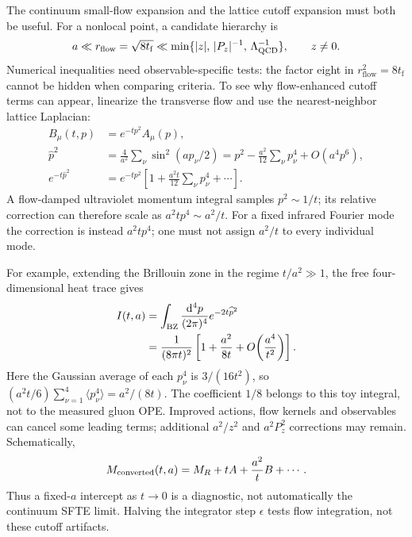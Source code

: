 \documentclass[11pt]{article}
\numberwithin{equation}{section}
\newcommand{\dd}{\mathrm{d}}
\newcommand{\rflow}{r_{\mathrm{flow}}}
\newcommand{\tf}{t_{\mathrm f}}
\begin{document}
The continuum small-flow expansion and the lattice cutoff expansion must
both be useful. For a nonlocal point, a candidate hierarchy is
\begin{equation}
 a\ll \rflow=\sqrt{8\tf}
 \ll\min\{|z|,\,|P_z|^{-1},\,\Lambda_{\rm QCD}^{-1}\},
 \qquad z\ne0.
 \label{eq:october-window}
\end{equation}
Numerical inequalities need observable-specific tests: the factor eight
in \(\rflow^2=8\tf\) cannot be hidden when comparing criteria.
To see why flow-enhanced cutoff terms can appear, linearize the transverse
flow and use the nearest-neighbor lattice Laplacian:
\begin{align}
 B_\mu(t,p)&=e^{-tp^2}A_\mu(p),\\
 \widehat p^2
 &=\frac4{a^2}\sum_\nu\sin^2(ap_\nu/2)
 =p^2-\frac{a^2}{12}\sum_\nu p_\nu^4+O(a^4p^6),\\
 e^{-t\widehat p^2}
 &=e^{-tp^2}
   \left[1+\frac{a^2t}{12}\sum_\nu p_\nu^4+\cdots\right].
 \label{eq:lattice-flow-kernel-expansion}
\end{align}
A flow-damped ultraviolet momentum integral samples \(p^2\sim1/t\);
its relative correction can therefore scale as
\(a^2tp^4\sim a^2/t\).
For a fixed infrared Fourier mode the correction is instead \(a^2tp^4\);
one must not assign \(a^2/t\) to every individual mode.

For example, extending the Brillouin zone in the regime \(t/a^2\gg1\),
the free four-dimensional heat trace gives
\begin{align}
 I(t,a)&=\int_{\rm BZ}\frac{\dd^4p}{(2\pi)^4}
                       e^{-2t\widehat p^2}\\
 &=\frac1{(8\pi t)^2}
   \left[1+\frac{a^2}{8t}+O\!\left(\frac{a^4}{t^2}\right)\right].
 \label{eq:heat-trace-cutoff}
\end{align}
Here the Gaussian average of each \(p_\nu^4\) is
\(3/(16t^2)\), so
\((a^2t/6)\sum_{\nu=1}^4\langle p_\nu^4\rangle=a^2/(8t)\).
The coefficient \(1/8\) belongs to this toy integral, not to the measured
gluon OPE. Improved actions, flow kernels and observables can cancel some
leading terms; additional \(a^2/z^2\) and \(a^2P_z^2\) corrections may remain.
Schematically,
\begin{equation}
 M_{\rm converted}(t,a)=M_R+tA+\frac{a^2}{t}B+\cdots .
\end{equation}
Thus a fixed-\(a\) intercept as \(t\to0\) is a diagnostic, not automatically
the continuum SFTE limit. Halving the integrator step \(\epsilon\) tests
flow integration, not these cutoff artifacts.
\end{document}
